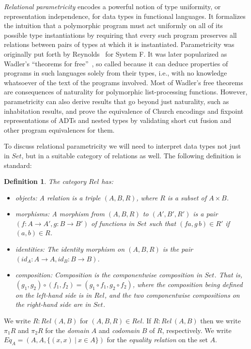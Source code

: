 \documentclass[submission,copyright,creativecommons]{eptcs}
\newtheorem{definition}[thm]{Definition}
\begin{document}
{\em Relational parametricity} encodes a powerful notion of type
uniformity, or representation independence, for data types in
functional languages. It formalizes the intuition that a polymorphic
program must act uniformly on all of its possible type instantiations
by requiring that every such program preserves all relations between
pairs of types at which it is instantiated. Parametricity was
originally put forth by Reynolds~\cite{rey83} for System F. It was
later popularized as Wadler's ``theorems for free''~\cite{wad89}, so
called because it can deduce properties of programs in such languages
solely from their types, i.e., with no knowledge whatsoever of the
text of the programs involved.  Most of Wadler's free theorems are
consequences of naturality for polymorphic list-processing
functions. However, parametricity can also derive results that go
beyond just naturality, such as inhabitation results, and prove the
equivalence of Church encodings and fixpoint representations of ADTs
and
nested types by validating short cut fusion and other program
equivalences for them.

To discuss relational parametricity we will need to interpret data
types not just in $\mathit{Set}$, but in a suitable category of
relations as well. The following definition is standard:
\begin{definition}
  The category $\mathit{Rel}$ has:
  \begin{itemize}
\item objects: A relation is a triple $(A,B,R)$, where $R$ is a
  subset of $A \times B$.
\item morphisms: A morphism from $(A,B,R)$ to $(A',B',R')$ is a pair
  $(f : A \to A',g : B \to B')$ of functions in $\mathit{Set}$ such
  that $(f a,g\,b) \in R'$ if $(a,b) \in R$.
\item identities: The identity morphism on $(A,B,R)$ is the pair
  $(\mathit{id}_A : A \to A, \mathit{id}_B : B \to B)$.
\item composition: Composition is the componentwise composition in
  $\mathit{Set}$. That is, $(g_1,g_2) \circ (f_1,f_2) = (g_1 \circ
  f_1, g_2 \circ f_2)$, where the composition being defined on the
  left-hand side is in $\mathit{Rel}$, and the two componentwise
  compositions on the right-hand side are in $\mathit{Set}$.
\end{itemize}
\end{definition}
\noindent
We write $R : \mathit{Rel}\,(A,B)$ for $(A,B,R) \in \mathit{Rel}$.  If
$R : \mathit{Rel}\,(A,B)$ then we write $\pi_1 R$ and $\pi_2 R$ for
the {\em domain} $A$ and {\em codomain} $B$ of $R$, respectively. We
write $\mathit{Eq}_A = (A,A,\{(x,x)~|~ x \in A\})$ for the {\em
  equality relation} on the set $A$.
\end{document}
